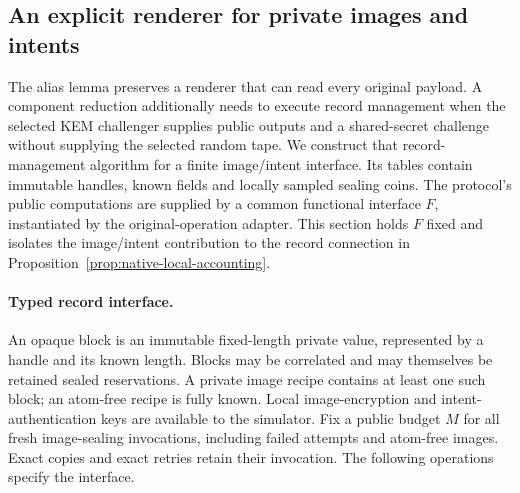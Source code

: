 \subsection{An explicit renderer for private images and intents}
\label{sec:opaque-rendering}

The alias lemma preserves a renderer that can read every original payload.
A component reduction additionally needs to execute record management when
the selected KEM challenger supplies public outputs and a shared-secret
challenge without supplying the selected random tape. We construct that
record-management algorithm for a finite image/intent interface. Its tables
contain immutable handles, known fields and locally sampled sealing coins.
The protocol's public computations are supplied by a common functional
interface $F$, instantiated by the original-operation adapter. This section
holds $F$ fixed and isolates the image/intent contribution to the record
connection in Proposition~\ref{prop:native-local-accounting}.

\paragraph{Typed record interface.}
An opaque block is an immutable fixed-length private value, represented by a
handle and its known length. Blocks may be correlated and may themselves be
retained sealed reservations. A private image recipe contains at least one
such block; an atom-free recipe is fully known. Local image-encryption and
intent-authentication keys are available to the simulator. Fix a public
budget $M$ for all fresh image-sealing invocations, including failed attempts
and atom-free images. Exact copies and exact retries retain their invocation.
The following operations specify the interface.

